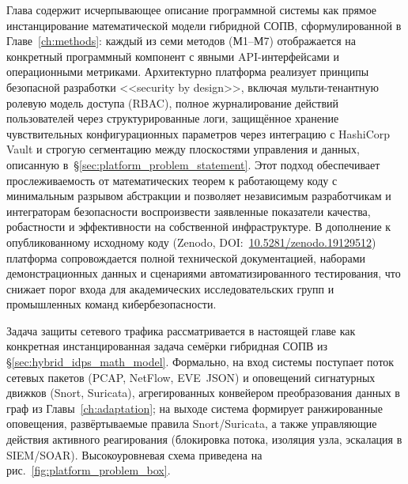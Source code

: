 Глава содержит исчерпывающее описание программной системы как
прямое инстанцирование математической модели гибридной СОПВ,
сформулированной в Главе~\ref{ch:methods}: каждый из семи методов
(М1--М7) отображается на конкретный программный компонент с
явными API-интерфейсами и операционными метриками. Архитектурно
платформа реализует принципы безопасной разработки <<security by
design>>, включая мульти-тенантную ролевую модель доступа (RBAC),
полное журналирование действий пользователей через
структурированные логи, защищённое хранение чувствительных
конфигурационных параметров через интеграцию с HashiCorp Vault и
строгую сегментацию между плоскостями управления и данных,
описанную в~\S\ref{sec:platform_problem_statement}. Этот подход
обеспечивает прослеживаемость от математических теорем к
работающему коду с минимальным разрывом абстракции и позволяет
независимым разработчикам и интеграторам безопасности воспроизвести
заявленные показатели качества, робастности и эффективности на
собственной инфраструктуре. В дополнение к опубликованному
исходному коду (Zenodo, DOI:~\url{10.5281/zenodo.19129512})
платформа сопровождается полной технической документацией,
наборами демонстрационных данных и сценариями автоматизированного
тестирования, что снижает порог входа для академических
исследовательских групп и промышленных команд кибербезопасности.

\label{sec:platform_problem_statement}%

Задача защиты сетевого трафика рассматривается в настоящей главе как
конкретная инстанцированная задача семёрки гибридная СОПВ из
\S\ref{sec:hybrid_idps_math_model}. Формально, на вход системы
поступает поток сетевых пакетов (PCAP, NetFlow, EVE~JSON) и
оповещений сигнатурных движков (Snort, Suricata), агрегированных
конвейером преобразования данных в граф из
Главы~\ref{ch:adaptation}; на выходе система формирует
ранжированные оповещения, развёртываемые правила Snort/Suricata,
а также управляющие действия активного реагирования (блокировка
потока, изоляция узла, эскалация в SIEM/SOAR). Высокоуровневая
схема приведена на рис.~\ref{fig:platform_problem_box}.

